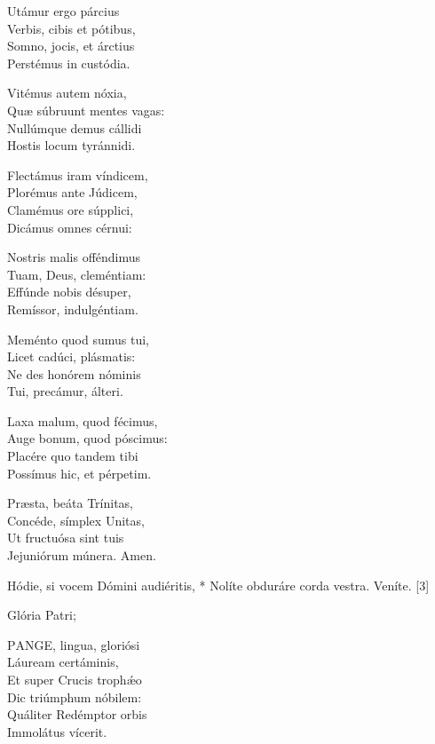 Utámur ergo párcius\\
Verbis, cibis et pótibus,\\
Somno, jocis, et árctius\\
Perstémus in custódia.

Vitémus autem nóxia,\\
Quæ súbruunt mentes vagas:\\
Nullúmque demus cállidi\\
Hostis locum tyránnidi.

Flectámus iram víndicem,\\
Plorémus ante Júdicem,\\
Clamémus ore súpplici,\\
Dicámus omnes cérnui:

Nostris malis offéndimus\\
Tuam, Deus, cleméntiam:\\
Effúnde nobis désuper,\\
Remíssor, indulgéntiam.

Meménto quod sumus tui,\\
Licet cadúci, plásmatis:\\
Ne des honórem nóminis\\
Tui, precámur, álteri.

Laxa malum, quod fécimus,\\
Auge bonum, quod póscimus:\\
Placére quo tandem tibi\\
Possímus hic, et pérpetim.


Præsta, beáta Trínitas,\\
Concéde, símplex Unitas,\\
Ut fructuósa sint tuis\\
Jejuniórum múnera. Amen.


 Hódie, si vocem Dómini audiéritis, * Nolíte obduráre corda vestra.  Veníte. [3]


 Glória Patri; 


\lettrine[lines=2]{P}{ANGE}, lingua, gloriósi\\
Láuream certáminis,\\
Et super Crucis trophǽo\\
Dic triúmphum nóbilem:\\
Quáliter Redémptor orbis\\
Immolátus vícerit.

